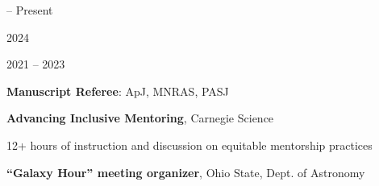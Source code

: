 \documentclass[cv.tex]{subfiles}
\begin{document}
\parbox{0.18\textwidth}{%
	 -- Present \par
	2024 \par
	\null \par
	2021 -- 2023 \par
}
\hspace{1mm}
\parbox{0.8\textwidth}{%
	\vspace{1mm}
	\textbf{Manuscript Referee}: ApJ, MNRAS, PASJ \par
	\textbf{Advancing Inclusive Mentoring}, Carnegie Science \par
	12+ hours of instruction and discussion on equitable mentorship practices \par
	\textbf{``Galaxy Hour'' meeting organizer}, Ohio State, Dept. of Astronomy
	\par
}
\end{document}
